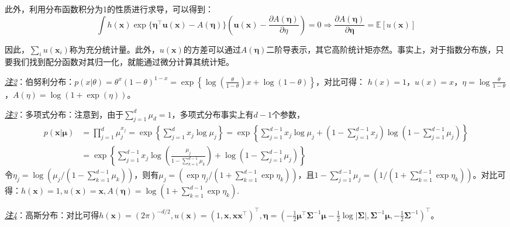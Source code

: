 \documentclass{article}
\begin{document}
\begin{itemize}
\begin{scriptsize}
\begin{spacing}{1.2}
{	此外，利用分布函数积分为1的性质进行求导，可以得到：
	\begin{equation*}
	\int  h(\bm{x}) \exp\{ \bm{\eta}^\top \bm{u}(\bm{x}) - A(\bm{\eta}) \} \left(\bm{u}(\bm{x}) - \frac{\partial A(\bm{\eta})}{\partial \eta} \right) = 0  \Rightarrow \frac{\partial A(\bm{\eta})}{\partial \bm{\eta}} = \mathbb{E} [u(\bm{x})]
	\end{equation*}

因此，$\sum_i u(\bm{x}_i)$称为充分统计量。此外，$u(\bm{x})$的方差可以通过$A(\bm{\eta})$二阶导表示，其它高阶统计矩亦然。事实上，对于指数分布族，只要我们找到配分函数对其归一化，就能通过微分计算其统计矩。
	
	\textit{\underline{注2}}：伯努利分布：$p(x|\theta) = \theta^x(1-\theta)^{1-x} 
	= \exp\left\{ \log \left( \frac{\theta}{1-\theta}\right) x + \log(1-\theta)\right\}$，对比可得：
	$h(x)=1$，$u(x)=x$，$\eta=\log \frac{\theta}{1-\theta} $，$A(\eta)=\log (1+\exp(\eta))$。

	\textit{\underline{注3}}：多项式分布：注意到，由于$\sum_{j=1}^d \mu_d = 1$，多项式分布事实上有$d-1$个参数，
	\begin{equation*}
	\begin{split}
	p(\bm{x}|\bm{\mu}) &= \prod_{j=1}^d \mu_j^{x_j} = \exp\left\{ \sum_{j=1}^d x_j \log \mu_j \right\} = \exp\left\{ \sum_{j=1}^{d-1} x_j \log \mu_j + \left(1-\sum_{j=1}^{d-1} x_j \right) \log \left(1-\sum_{j=1}^{d-1} \mu_j \right) \right\} \\
	&= \exp\left\{ \sum_{j=1}^{d-1} x_j \log \left( \frac{\mu_j}{1-\sum_{k=1}^{d-1} \mu_k} \right) +  \log \left(1-\sum_{j=1}^{d-1} \mu_j \right) \right\}
	\end{split}
	\end{equation*}
令$\eta_j =  \log \left(\mu_j/(1-\sum_{k=1}^{d-1} \mu_k)\right)$，则有$\mu_j = \left(\exp\eta_j / (1+\sum_{k=1}^{d-1} \exp \eta_k)\right)$，且$1-\sum_{j=1}^{d-1} \mu_j =\left(1 / (1+\sum_{k=1}^{d-1} \exp \eta_k)\right)$。对比可得：$h(\bm{x})=1, u(\bm{x})=\bm{x}, A(\bm{\eta})=\log (1+\sum_{k=1}^{d-1} \exp \eta_k)$.
	
	\textit{\underline{注4}}：高斯分布：对比可得$h(\bm{x})=(2\pi)^{-d/2}, u(\bm{x})=(1, \bm{x}, \bm{x}\bm{x}^\top)^\top, \bm{\eta}=(-\frac{1}{2} \bm{\mu}^\top \bm{\Sigma}^{-1} \bm{\mu}-\frac{1}{2}\log|\bm{\Sigma}|, \bm{\Sigma}^{-1}\bm{\mu}, -\frac{1}{2} \bm{\Sigma}^{-1})^\top$。
	}
	\end{spacing}
	\end{scriptsize}
	\vspace{-2mm}
	\end{itemize}
\end{document}
